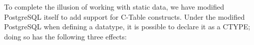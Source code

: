 %
%


To complete the illusion of working with static data, we have modified PostgreSQL itself to add support for C-Table constructs.  Under the modified PostgreSQL when defining a datatype, it is possible to declare it as a CTYPE; doing so has the following three effects:
